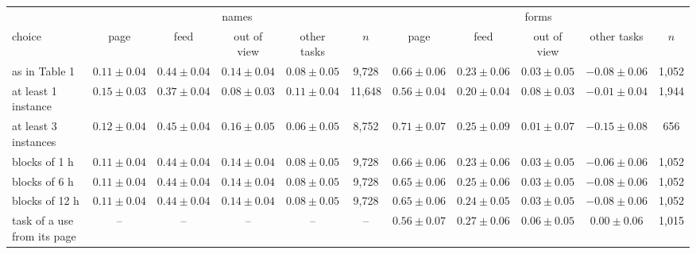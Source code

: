 \begin{tabular}{lcccccccccc}
\toprule
 & \multicolumn{5}{c}{names} & \multicolumn{5}{c}{forms} \\
\cmidrule(lr){2-6}\cmidrule(lr){7-11}
choice & page & feed & out of view & other tasks & $n$ & page & feed & out of view & other tasks & $n$ \\
\midrule
as in Table 1 & $0.11 \pm 0.04$ & $0.44 \pm 0.04$ & $0.14 \pm 0.04$ & $0.08 \pm 0.05$ & 9,728 & $0.66 \pm 0.06$ & $0.23 \pm 0.06$ & $0.03 \pm 0.05$ & $-0.08 \pm 0.06$ & 1,052 \\
at least 1 instance & $0.15 \pm 0.03$ & $0.37 \pm 0.04$ & $0.08 \pm 0.03$ & $0.11 \pm 0.04$ & 11,648 & $0.56 \pm 0.04$ & $0.20 \pm 0.04$ & $0.08 \pm 0.03$ & $-0.01 \pm 0.04$ & 1,944 \\
at least 3 instances & $0.12 \pm 0.04$ & $0.45 \pm 0.04$ & $0.16 \pm 0.05$ & $0.06 \pm 0.05$ & 8,752 & $0.71 \pm 0.07$ & $0.25 \pm 0.09$ & $0.01 \pm 0.07$ & $-0.15 \pm 0.08$ & 656 \\
blocks of 1 h & $0.11 \pm 0.04$ & $0.44 \pm 0.04$ & $0.14 \pm 0.04$ & $0.08 \pm 0.05$ & 9,728 & $0.66 \pm 0.06$ & $0.23 \pm 0.06$ & $0.03 \pm 0.05$ & $-0.06 \pm 0.06$ & 1,052 \\
blocks of 6 h & $0.11 \pm 0.04$ & $0.44 \pm 0.04$ & $0.14 \pm 0.04$ & $0.08 \pm 0.05$ & 9,728 & $0.65 \pm 0.06$ & $0.25 \pm 0.06$ & $0.03 \pm 0.05$ & $-0.08 \pm 0.06$ & 1,052 \\
blocks of 12 h & $0.11 \pm 0.04$ & $0.44 \pm 0.04$ & $0.14 \pm 0.04$ & $0.08 \pm 0.05$ & 9,728 & $0.65 \pm 0.06$ & $0.24 \pm 0.05$ & $0.03 \pm 0.05$ & $-0.08 \pm 0.06$ & 1,052 \\
task of a use from its page & -- & -- & -- & -- & -- & $0.56 \pm 0.07$ & $0.27 \pm 0.06$ & $0.06 \pm 0.05$ & $0.00 \pm 0.06$ & 1,015 \\
\bottomrule
\end{tabular}
